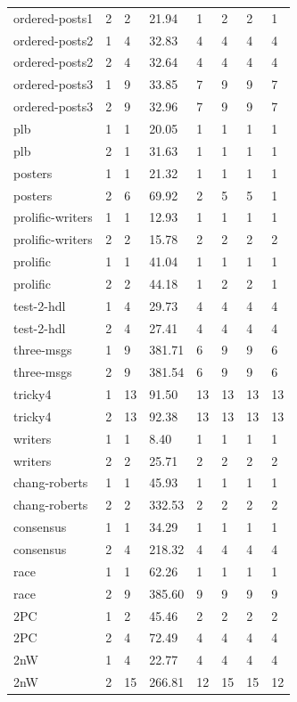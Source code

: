 \documentclass{standalone}
\begin{document}
\begin{tabular}{l l l | l | l l l l}
ordered-posts1 & 2 & 2 & 21.94 & 1 & 2 & 2 & 1\\
ordered-posts2 & 1 & 4 & 32.83 & 4 & 4 & 4 & 4\\
ordered-posts2 & 2 & 4 & 32.64 & 4 & 4 & 4 & 4\\
ordered-posts3 & 1 & 9 & 33.85 & 7 & 9 & 9 & 7\\
ordered-posts3 & 2 & 9 & 32.96 & 7 & 9 & 9 & 7\\
plb & 1 & 1 & 20.05 & 1 & 1 & 1 & 1\\
plb & 2 & 1 & 31.63 & 1 & 1 & 1 & 1\\
posters & 1 & 1 & 21.32 & 1 & 1 & 1 & 1\\
posters & 2 & 6 & 69.92 & 2 & 5 & 5 & 1\\
prolific-writers & 1 & 1 & 12.93 & 1 & 1 & 1 & 1\\
prolific-writers & 2 & 2 & 15.78 & 2 & 2 & 2 & 2\\
prolific & 1 & 1 & 41.04 & 1 & 1 & 1 & 1\\
prolific & 2 & 2 & 44.18 & 1 & 2 & 2 & 1\\
test-2-hdl & 1 & 4 & 29.73 & 4 & 4 & 4 & 4\\
test-2-hdl & 2 & 4 & 27.41 & 4 & 4 & 4 & 4\\
three-msgs & 1 & 9 & 381.71 & 6 & 9 & 9 & 6\\
three-msgs & 2 & 9 & 381.54 & 6 & 9 & 9 & 6\\
tricky4 & 1 & 13 & 91.50 & 13 & 13 & 13 & 13\\
tricky4 & 2 & 13 & 92.38 & 13 & 13 & 13 & 13\\
writers & 1 & 1 & 8.40 & 1 & 1 & 1 & 1\\
writers & 2 & 2 & 25.71 & 2 & 2 & 2 & 2\\
chang-roberts & 1 & 1 & 45.93 & 1 & 1 & 1 & 1\\
chang-roberts & 2 & 2 & 332.53 & 2 & 2 & 2 & 2\\
consensus & 1 & 1 & 34.29 & 1 & 1 & 1 & 1\\
consensus & 2 & 4 & 218.32 & 4 & 4 & 4 & 4\\
race & 1 & 1 & 62.26 & 1 & 1 & 1 & 1\\
race & 2 & 9 & 385.60 & 9 & 9 & 9 & 9\\
2PC & 1 & 2 & 45.46 & 2 & 2 & 2 & 2\\
2PC & 2 & 4 & 72.49 & 4 & 4 & 4 & 4\\
2nW & 1 & 4 & 22.77 & 4 & 4 & 4 & 4\\
2nW & 2 & 15 & 266.81 & 12 & 15 & 15 & 12\\

\end{tabular}
\end{document}
